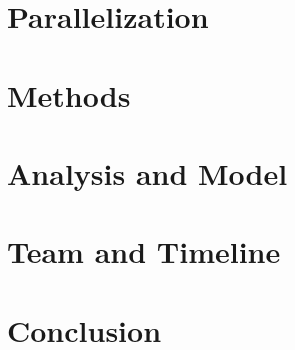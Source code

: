 \documentclass{acm_proc_article-sp}
\begin{document}
\section{Parallelization}


\section{Methods}


\section{Analysis and Model}


\section{Team and Timeline}

\section{Conclusion}


\end{document}

